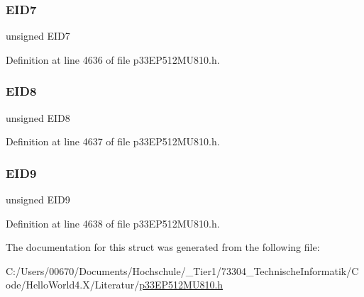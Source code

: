 \subsubsection{\texorpdfstring{E\+I\+D7}{EID7}}
{\footnotesize\ttfamily unsigned E\+I\+D7}



Definition at line 4636 of file p33\+E\+P512\+M\+U810.\+h.

\mbox{\label{structtag_c1_r_x_f15_e_i_d_b_i_t_s_acca25e0b7d86eb499d01f85222baea87}} 
\subsubsection{\texorpdfstring{E\+I\+D8}{EID8}}
{\footnotesize\ttfamily unsigned E\+I\+D8}



Definition at line 4637 of file p33\+E\+P512\+M\+U810.\+h.

\mbox{\label{structtag_c1_r_x_f15_e_i_d_b_i_t_s_ac6748f73d4ada8538b06548be4f396c2}} 
\subsubsection{\texorpdfstring{E\+I\+D9}{EID9}}
{\footnotesize\ttfamily unsigned E\+I\+D9}



Definition at line 4638 of file p33\+E\+P512\+M\+U810.\+h.



The documentation for this struct was generated from the following file\+:\begin{DoxyCompactItemize}
\item 
C\+:/\+Users/00670/\+Documents/\+Hochschule/\+\_\+\+Tier1/73304\+\_\+\+Technische\+Informatik/\+Code/\+Hello\+World4.\+X/\+Literatur/\hyperlink{p33_e_p512_m_u810_8h}{p33\+E\+P512\+M\+U810.\+h}\end{DoxyCompactItemize}
